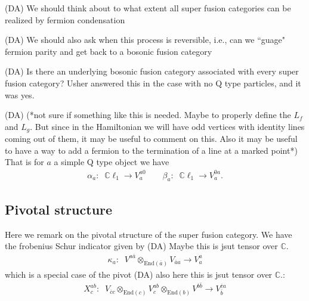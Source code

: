 \documentclass[12pt,a4paper]{article}
\newcommand{\tp}{\otimes}
\newcommand{\dave}[1]{{\color{ao(english)}\footnotesize{(DA) #1}}}
\begin{document}
\dave{We should think about to what extent all super fusion categories can be realized by fermion condensation}

\dave{We should also ask when this process is reversible, i.e., can we ``guage" fermion parity and get back to a bosonic fusion category}

\dave{Is there an underlying bosonic fusion category associated with every super fusion category? Usher answered this in the case with no Q type particles, and it was yes.} 

\dave{(*not sure if something like this is needed. Maybe to properly define the $L_f$ and $L_g$. But since in the Hamiltonian we will have odd vertices with identity lines coming out of them, it may be useful to comment on this. Also it may be useful to have a way to add a fermion to the termination of a line at a marked point*)
That is for $a$ a simple Q type object we have
\begin{align}
\alpha_a: \; \; \mathbb{C} \ell_1 \rightarrow V^{a 0 }_a \quad \quad \beta_a: \; \; \mathbb{C} \ell_1 \rightarrow V^{0a }_a.
\end{align}
}

\subsection{Pivotal structure}
Here we remark on the pivotal structure of the super fusion category.
We have the frobenius Schur indicator given by \dave{Maybe this is jsut tensor over $\mathbb{C}$.}
\begin{align}
\kappa_a: \;\; V^{a \bar{a}} \tp_{\text{End}(\bar{a})} V_{\bar{a}a} \rightarrow V^a_a
\end{align}
which is a special case of the pivot \dave{also here this is jsut tensor over $\mathbb{C}$.}:
\begin{align}
X^{ab}_c: \; \; V_{\bar{c} c} \tp_{\text{End}(c)} V^{ab}_c \tp_{\text{End}(b)} V^{b \bar{b}} \rightarrow V^{\bar{c} a}_{\bar{b}}
\end{align}
\end{document}
